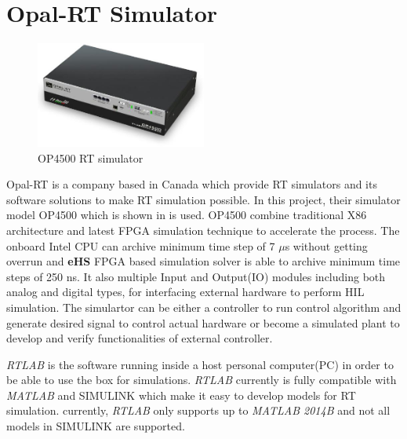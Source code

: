 \section{Opal-RT Simulator}
\begin{figure}[b]
     \centering
     \includegraphics[width = 0.5\textwidth]{figures/op4500.jpg}
     \caption{OP4500 \gls{RT} simulator}
     \label{fig:op4500}
\end{figure}
Opal-RT is a company based in Canada which provide \gls{RT} simulators and its software solutions to make \gls{RT} simulation possible. In this project, their simulator model OP4500 which is shown in  is used. OP4500 combine traditional X86 architecture and latest \gls{FPGA} simulation technique to accelerate the process. The onboard Intel CPU can archive minimum time step of 7 $\mu
$s without getting overrun and \textbf{eHS} \gls{FPGA} based simulation solver is able to archive minimum time steps of 250 ns. It also multiple Input and Output(IO) modules including both analog and digital types, for interfacing external hardware to perform \gls{HIL} simulation. The simulartor can be either a controller to run control algorithm and generate desired signal to control actual hardware or become a simulated plant to develop and verify functionalities of external controller. 

\textit{RTLAB} is the software running inside a host personal computer(PC) in order to be able to use the box for simulations. \textit{RTLAB} currently is fully compatible with \textit{MATLAB} and SIMULINK which make it easy to develop models for \gls{RT} simulation. currently, \textit{RTLAB} only supports up to \textit{MATLAB 2014B} and not all models in SIMULINK are supported. 

